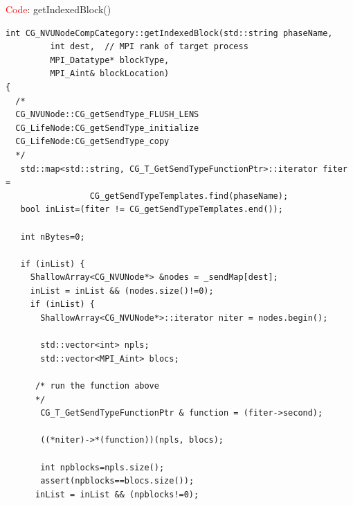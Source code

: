 \textcolor{red}{Code}: getIndexedBlock()
{\tiny
\begin{verbatim}
int CG_NVUNodeCompCategory::getIndexedBlock(std::string phaseName, 
         int dest,  // MPI rank of target process
         MPI_Datatype* blockType, 
         MPI_Aint& blockLocation) 
{
  /*
  CG_NVUNode::CG_getSendType_FLUSH_LENS
  CG_LifeNode:CG_getSendType_initialize
  CG_LifeNode:CG_getSendType_copy
  */
   std::map<std::string, CG_T_GetSendTypeFunctionPtr>::iterator fiter = 
                 CG_getSendTypeTemplates.find(phaseName);                                                                              
   bool inList=(fiter != CG_getSendTypeTemplates.end());                                                      

   int nBytes=0;

   if (inList) {
     ShallowArray<CG_NVUNode*> &nodes = _sendMap[dest];                                                      
     inList = inList && (nodes.size()!=0);                                                                   
     if (inList) {
       ShallowArray<CG_NVUNode*>::iterator niter = nodes.begin();
       
       std::vector<int> npls;                                                                               
       std::vector<MPI_Aint> blocs;                                                                         
      
      /* run the function above      
      */
       CG_T_GetSendTypeFunctionPtr & function = (fiter->second);                                           

       ((*niter)->*(function))(npls, blocs);

       int npblocks=npls.size();                                                                            
       assert(npblocks==blocs.size());                                                                      
      inList = inList && (npblocks!=0);                                                                    


\end{verbatim}}
